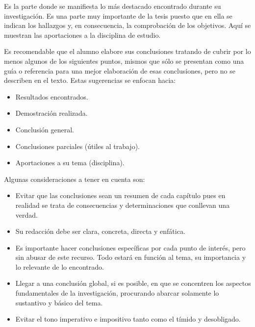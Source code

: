 \documentclass[12]{tesis_tecnologica}
\begin{document}





\begin{conclusiones}
Es la parte donde se manifiesta lo más destacado encontrado durante su investigación. Es una parte muy importante de la tesis puesto que en ella se indican los hallazgos y, en consecuencia, la comprobación de los objetivos. Aquí se muestran las aportaciones a la disciplina de estudio.\newline

Es recomendable que el alumno elabore sus conclusiones tratando de cubrir por lo menos algunos de los siguientes puntos, mismos que sólo se presentan como una guía o referencia para una mejor elaboración de esas conclusiones, pero no se describen en el texto. Estas sugerencias se enfocan hacia:

\begin{itemize}
    \item Resultados encontrados.
    \item Demostración realizada.
    \item Conclusión general.
    \item Conclusiones parciales (útiles al trabajo).
    \item Aportaciones a su tema (disciplina).
\end{itemize}

Algunas consideraciones a tener en cuenta son:

\begin{itemize}
    \item Evitar que las conclusiones sean un resumen de cada capítulo pues en realidad se trata de consecuencias y determinaciones que conllevan una verdad.
    \item Su redacción debe ser clara, concreta, directa y enfática.
    \item Es importante hacer conclusiones específicas por cada punto de interés, pero sin abusar de este recurso. Todo estará en función al tema, su importancia y lo relevante de lo encontrado.
    \item Llegar a una conclusión global, si es posible, en que se concentren los aspectos fundamentales de la investigación, procurando abarcar solamente lo sustantivo y básico del tema.
    \item Evitar el tono imperativo e impositivo tanto como el tímido y desobligado.
\end{itemize}


\end{conclusiones}




\appendix

\end{document}
